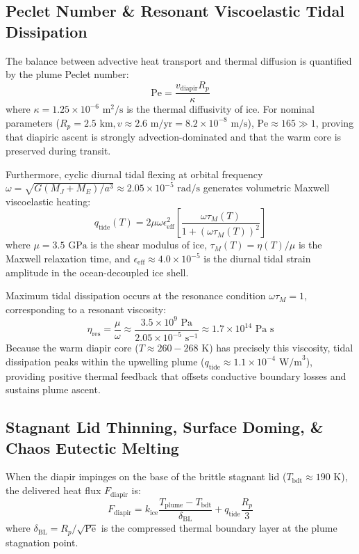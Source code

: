 \documentclass[11pt,a4paper]{article}
\begin{document}
\subsection{Peclet Number \& Resonant Viscoelastic Tidal Dissipation}
The balance between advective heat transport and thermal diffusion is quantified by the plume Peclet number:
\begin{equation}
\text{Pe} = \frac{v_{\text{diapir}} R_p}{\kappa}
\end{equation}
where $\kappa = 1.25 \times 10^{-6}\text{ m}^2\text{/s}$ is the thermal diffusivity of ice. For nominal parameters ($R_p = 2.5\text{ km}, v \approx 2.6\text{ m/yr} = 8.2 \times 10^{-8}\text{ m/s}$), $\text{Pe} \approx 165 \gg 1$, proving that diapiric ascent is strongly advection-dominated and that the warm core is preserved during transit.

Furthermore, cyclic diurnal tidal flexing at orbital frequency $\omega = \sqrt{G(M_J + M_E)/a^3} \approx 2.05 \times 10^{-5}\text{ rad/s}$ generates volumetric Maxwell viscoelastic heating:
\begin{equation}
q_{\text{tide}}(T) = 2 \mu \omega \epsilon_{\text{eff}}^2 \left[ \frac{\omega \tau_M(T)}{1 + (\omega \tau_M(T))^2} \right]
\end{equation}
where $\mu = 3.5\text{ GPa}$ is the shear modulus of ice, $\tau_M(T) = \eta(T)/\mu$ is the Maxwell relaxation time, and $\epsilon_{\text{eff}} \approx 4.0 \times 10^{-5}$ is the diurnal tidal strain amplitude in the ocean-decoupled ice shell.

Maximum tidal dissipation occurs at the resonance condition $\omega \tau_M = 1$, corresponding to a resonant viscosity:
\begin{equation}
\eta_{\text{res}} = \frac{\mu}{\omega} \approx \frac{3.5 \times 10^9\text{ Pa}}{2.05 \times 10^{-5}\text{ s}^{-1}} \approx 1.7 \times 10^{14}\text{ Pa s}
\end{equation}
Because the warm diapir core ($T \approx 260 - 268\text{ K}$) has precisely this viscosity, tidal dissipation peaks within the upwelling plume ($q_{\text{tide}} \approx 1.1 \times 10^{-4}\text{ W/m}^3$), providing positive thermal feedback that offsets conductive boundary losses and sustains plume ascent.

\subsection{Stagnant Lid Thinning, Surface Doming, \& Chaos Eutectic Melting}
When the diapir impinges on the base of the brittle stagnant lid ($T_{\text{bdt}} \approx 190\text{ K}$), the delivered heat flux $F_{\text{diapir}}$ is:
\begin{equation}
F_{\text{diapir}} = k_{\text{ice}} \frac{T_{\text{plume}} - T_{\text{bdt}}}{\delta_{\text{BL}}} + q_{\text{tide}} \frac{R_p}{3}
\end{equation}
where $\delta_{\text{BL}} = R_p / \sqrt{\text{Pe}}$ is the compressed thermal boundary layer at the plume stagnation point.
\end{document}
